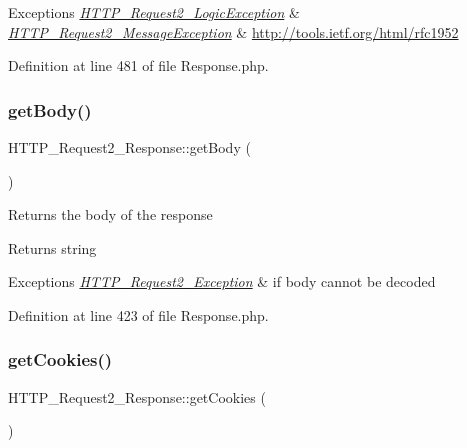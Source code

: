 \begin{DoxyExceptions}{Exceptions}
{\em \hyperlink{classHTTP__Request2__LogicException}{H\+T\+T\+P\+\_\+\+Request2\+\_\+\+Logic\+Exception}} & \\
\hline
{\em \hyperlink{classHTTP__Request2__MessageException}{H\+T\+T\+P\+\_\+\+Request2\+\_\+\+Message\+Exception}} & \hyperlink{}{http\+://tools.\+ietf.\+org/html/rfc1952}\\
\hline
\end{DoxyExceptions}


Definition at line 481 of file Response.\+php.

\hypertarget{classHTTP__Request2__Response_a2aa534b9ea2994761e3b9260908ad678}{}\label{classHTTP__Request2__Response_a2aa534b9ea2994761e3b9260908ad678} 
\subsubsection{\texorpdfstring{get\+Body()}{getBody()}}
{\footnotesize\ttfamily H\+T\+T\+P\+\_\+\+Request2\+\_\+\+Response\+::get\+Body (\begin{DoxyParamCaption}{ }\end{DoxyParamCaption})}

Returns the body of the response

\begin{DoxyReturn}{Returns}
string 
\end{DoxyReturn}

\begin{DoxyExceptions}{Exceptions}
{\em \hyperlink{classHTTP__Request2__Exception}{H\+T\+T\+P\+\_\+\+Request2\+\_\+\+Exception}} & if body cannot be decoded \\
\hline
\end{DoxyExceptions}


Definition at line 423 of file Response.\+php.

\hypertarget{classHTTP__Request2__Response_a1c8c23d204f797dd18a31aa5a9c50414}{}\label{classHTTP__Request2__Response_a1c8c23d204f797dd18a31aa5a9c50414} 
\subsubsection{\texorpdfstring{get\+Cookies()}{getCookies()}}
{\footnotesize\ttfamily H\+T\+T\+P\+\_\+\+Request2\+\_\+\+Response\+::get\+Cookies (\begin{DoxyParamCaption}{ }\end{DoxyParamCaption})}

